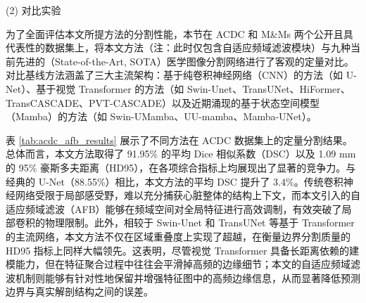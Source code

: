 \documentclass[12pt, a4paper, twoside]{article}
\begin{document}
(2) 对比实验

为了全面评估本文所提方法的分割性能，本节在 ACDC 和 M\&Ms 两个公开且具代表性的数据集上，将本文方法（注：此时仅包含自适应频域滤波模块）与九种当前先进的（State-of-the-Art, SOTA）医学图像分割网络进行了客观的定量对比。对比基线方法涵盖了三大主流架构：基于纯卷积神经网络（CNN）的方法（如 U-Net）、基于视觉 Transformer 的方法（如 Swin-Unet、TransUNet、HiFormer、TransCASCADE、PVT-CASCADE）以及近期涌现的基于状态空间模型（Mamba）的方法（如 Swin-UMamba、UU-mamba、Mamba-UNet）。

表 \ref{tab:acdc_afb_results} 展示了不同方法在 ACDC 数据集上的定量分割结果。总体而言，本文方法取得了 91.95\% 的平均 Dice 相似系数（DSC）以及 1.09 mm 的 95\% 豪斯多夫距离（HD95），在各项综合指标上均展现出了显著的竞争力。与经典的 U-Net（88.55\%）相比，本文方法的平均 DSC 提升了 3.4\%。传统卷积神经网络受限于局部感受野，难以充分捕获心脏整体的结构上下文，而本文引入的自适应频域滤波（AFB）能够在频域空间对全局特征进行高效调制，有效突破了局部卷积的物理限制。此外，相较于 Swin-Unet 和 TransUNet 等基于 Transformer 的主流网络，本文方法不仅在区域重叠度上实现了超越，在衡量边界分割质量的 HD95 指标上同样大幅领先。这表明，尽管视觉 Transformer 具备长距离依赖的建模能力，但在特征聚合过程中往往会平滑掉高频的边缘细节；本文的自适应频域滤波机制则能够有针对性地保留并增强特征图中的高频边缘信息，从而显著降低预测边界与真实解剖结构之间的误差。
\end{document}
